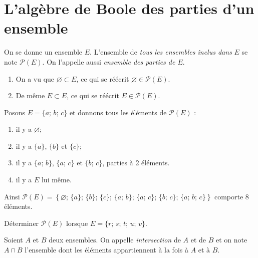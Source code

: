 \documentclass[a4paper,12pt,french]{book}
\let\emptyset\varnothing
\begin{document}
\section{L'algèbre de Boole des parties d'un ensemble}
\begin{definition}
On se donne un ensemble $E$. L'ensemble de \textit{tous les ensembles inclus dans } $E$ se note $\mathcal{P}(E)$. On l'appelle aussi \textit{ensemble des parties de $E$}.
\begin{enumerate}[--]
	\item 	On a vu que $\emptyset\subset E$, ce qui se réécrit $\emptyset\in\mathcal{P}(E)$.
	\item 	De même $E\subset E$, ce qui se réécrit $E\in\mathcal{P}(E)$.
\end{enumerate}
\end{definition}
\begin{exemple}[]
Posons $E=\{a;\,b;\,c\}$ et donnons tous les éléments de $\mathcal{P}(E)$ :
\begin{enumerate}[--]
	\item 	il y a $\emptyset$;
	\item 	il y a $\{a\}$, $\{b\}$ et $\{c\}$;
	\item 	il y a $\{a;\,b\}$, $\{a;\,c\}$ et $\{b;\,c\}$, parties à 2 éléments.
	\item 	il y a $E$ lui même.
\end{enumerate}
Ainsi $\mathcal{P}(E)=\left\{\emptyset;\,\{a\};\,\{b\};\,\{c\};\,\{a;\,b\};\,\{a;\,c\};\,\{b;\,c\};\,\{a;\,b;\,c\}\right\}$ comporte 8 éléments.
\end{exemple}

\begin{exercice}[]
Déterminer $\mathcal{P}(E)$ lorsque $E=\{r;\,s;\,t;\,u;\,v\}$.
\end{exercice}
\begin{definition}[ : intersection]
			\begin{center}
			\end{center}
			Soient $A$ et $B$ deux ensembles. On appelle \textit{intersection} de $A$ et de $B$ et on note $A\cap B$ l'ensemble dont les éléments appartiennent à la
			fois à $A$ et à $B$.
		\end{definition}
\end{document}
